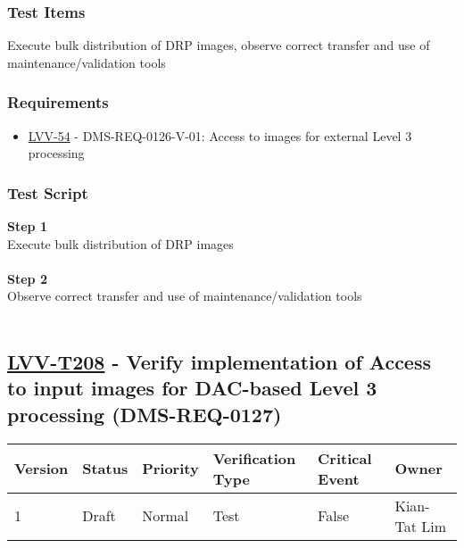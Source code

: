 \hypertarget{test-items-183}{%
\subsubsection{Test Items}\label{test-items-183}}

Execute bulk distribution of DRP images, observe correct transfer and
use of maintenance/validation tools

\hypertarget{requirements-184}{%
\subsubsection{Requirements}\label{requirements-184}}

\begin{itemize}
\tightlist
\item
  \href{https://jira.lsstcorp.org/browse/LVV-54}{LVV-54} -
  DMS-REQ-0126-V-01: Access to images for external Level 3 processing
\end{itemize}

\hypertarget{test-script-184}{%
\subsubsection{Test Script}\label{test-script-184}}

\textbf{Step 1}\\
Execute bulk distribution of DRP images\\
~\\
\textbf{Step 2}\\
Observe correct transfer and use of maintenance/validation tools\\
~\\

\hypertarget{lvv-t208---verify-implementation-of-access-to-input-images-for-dac-based-level-3-processing-dms-req-0127}{%
\subsection{\texorpdfstring{\href{https://jira.lsstcorp.org/secure/Tests.jspa\#/testCase/LVV-T208}{LVV-T208}
- Verify implementation of Access to input images for DAC-based Level 3
processing
(DMS-REQ-0127)}{LVV-T208 - Verify implementation of Access to input images for DAC-based Level 3 processing (DMS-REQ-0127)}}\label{lvv-t208---verify-implementation-of-access-to-input-images-for-dac-based-level-3-processing-dms-req-0127}}

\begin{longtable}[]{@{}llllll@{}}
\toprule
Version & Status & Priority & Verification Type & Critical Event &
Owner\tabularnewline
\midrule
\endhead
1 & Draft & Normal & Test & False & Kian-Tat Lim\tabularnewline
\bottomrule
\end{longtable}

